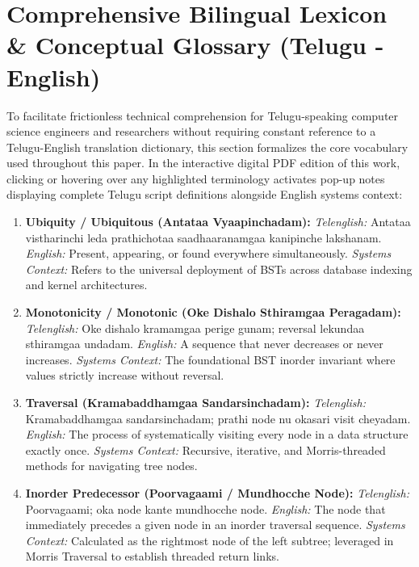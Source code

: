 \documentclass[10pt,twocolumn,letterpaper]{article}
\begin{document}
\section{Comprehensive Bilingual Lexicon \& Conceptual Glossary (Telugu - English)}
\label{sec:lexicon}

To facilitate frictionless technical comprehension for Telugu-speaking computer science engineers and researchers without requiring constant reference to a Telugu-English translation dictionary, this section formalizes the core vocabulary used throughout this paper. In the interactive digital PDF edition of this work, clicking or hovering over any highlighted terminology activates pop-up notes displaying complete Telugu script definitions alongside English systems context:

\begin{enumerate}
    \item \textbf{Ubiquity / Ubiquitous (Antataa Vyaapinchadam):}
    \textit{Telenglish:} Antataa vistharinchi leda prathichotaa saadhaaranamgaa kanipinche lakshanam.
    \textit{English:} Present, appearing, or found everywhere simultaneously.
    \textit{Systems Context:} Refers to the universal deployment of BSTs across database indexing and kernel architectures.

    \item \textbf{Monotonicity / Monotonic (Oke Dishalo Sthiramgaa Peragadam):}
    \textit{Telenglish:} Oke dishalo kramamgaa perige gunam; reversal lekundaa sthiramgaa undadam.
    \textit{English:} A sequence that never decreases or never increases.
    \textit{Systems Context:} The foundational BST inorder invariant where values strictly increase without reversal.

    \item \textbf{Traversal (Kramabaddhamgaa Sandarsinchadam):}
    \textit{Telenglish:} Kramabaddhamgaa sandarsinchadam; prathi node nu okasari visit cheyadam.
    \textit{English:} The process of systematically visiting every node in a data structure exactly once.
    \textit{Systems Context:} Recursive, iterative, and Morris-threaded methods for navigating tree nodes.

    \item \textbf{Inorder Predecessor (Poorvagaami / Mundhocche Node):}
    \textit{Telenglish:} Poorvagaami; oka node kante mundhocche node.
    \textit{English:} The node that immediately precedes a given node in an inorder traversal sequence.
    \textit{Systems Context:} Calculated as the rightmost node of the left subtree; leveraged in Morris Traversal to establish threaded return links.


\end{enumerate}
\end{document}
